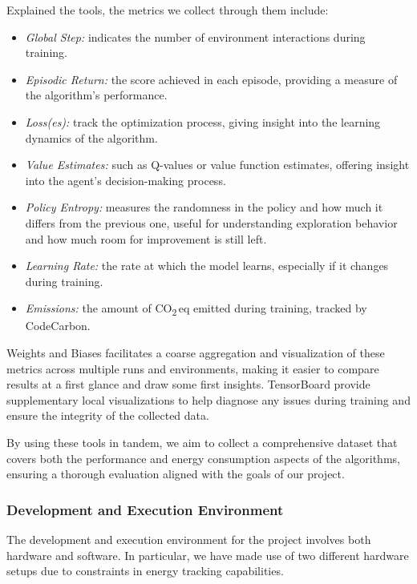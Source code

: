 Explained the tools, the metrics we collect through them include:
\begin{itemize}
	\item \textit{Global Step:} indicates the number of environment interactions during training.
	\item \textit{Episodic Return:} the score achieved in each episode, providing a measure of the algorithm's performance.
	\item \textit{Loss(es):} track the optimization process, giving insight into the learning dynamics of the algorithm.
	\item \textit{Value Estimates:} such as Q-values or value function estimates, offering insight into the agent's decision-making process.
	\item \textit{Policy Entropy:} measures the randomness in the policy and how much it differs from the previous one, useful for understanding exploration behavior and how much room for improvement is still left.
	\item \textit{Learning Rate:} the rate at which the model learns, especially if it changes during training.
	\item \textit{Emissions:} the amount of CO\textsubscript{2}\,eq emitted during training, tracked by CodeCarbon.
\end{itemize}

Weights and Biases facilitates a coarse aggregation and visualization of these metrics across multiple runs and environments, making it easier to compare results at a first glance and draw some first insights. TensorBoard provide supplementary local visualizations to help diagnose any issues during training and ensure the integrity of the collected data.

By using these tools in tandem, we aim to collect a comprehensive dataset that covers both the performance and energy consumption aspects of the algorithms, ensuring a thorough evaluation aligned with the goals of our project.

\subsubsection{Development and Execution Environment}
\label{subsubsec:development_execution_environment}

The development and execution environment for the project involves both hardware and software. In particular, we have made use of two different hardware setups due to constraints in energy tracking capabilities.

